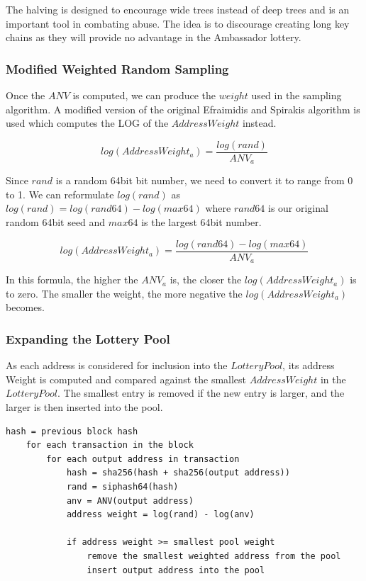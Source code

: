 \documentclass{article}
\begin{document}
The halving is designed to encourage wide trees instead of deep trees and is
an important tool in combating abuse. The idea is to discourage creating long
key chains as they will provide no advantage in the Ambassador lottery.

\subsubsection{Modified Weighted Random Sampling}
Once the $ANV$ is computed, we can produce the $weight$ used in the sampling algorithm.
A modified version of the original Efraimidis and Spirakis algorithm is used which computes
the LOG of the $AddressWeight$ instead.

$$log(AddressWeight_a) = \frac{log(rand)}{ANV_a}$$

Since $rand$ is a random 64bit bit number, we need to convert it to range from
0 to 1. We can reformulate $log(rand)$ as $log(rand) = log(rand64) - log(max64)$
where $rand64$ is our original random 64bit seed and $max64$ is the largest 64bit
number.

$$log(AddressWeight_a) = \frac{log(rand64) - log(max64)}{ANV_a}$$

In this formula, the higher the $ANV_a$ is, the closer the $log(AddressWeight_a)$ is
to zero. The smaller the weight, the more negative the $log(AddressWeight_a)$ becomes.


\subsubsection{Expanding the Lottery Pool}

As each address is considered for inclusion into the $LotteryPool$, its address
Weight is computed and compared against the smallest $AddressWeight$ in the
$LotteryPool$. The smallest entry is removed if the new entry is larger, and
the larger is then inserted into the pool.

\lstset{language=C}
\begin{lstlisting}[caption=Lottery Pool Pseudo Code]
    hash = previous block hash
    for each transaction in the block
        for each output address in transaction
            hash = sha256(hash + sha256(output address))
            rand = siphash64(hash)
            anv = ANV(output address)
            address weight = log(rand) - log(anv)

            if address weight >= smallest pool weight
                remove the smallest weighted address from the pool
                insert output address into the pool
\end{lstlisting}
\end{document}
